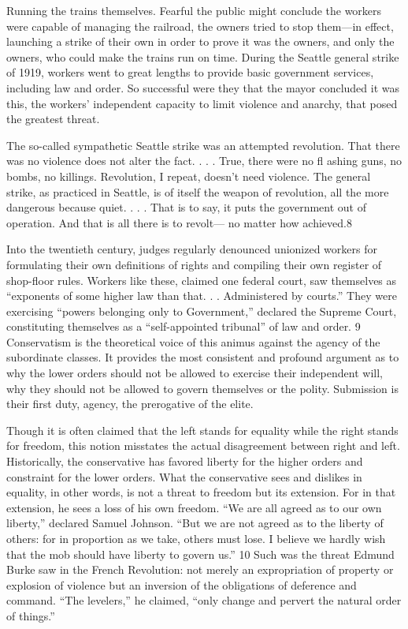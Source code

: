  \par 
Running the trains themselves. Fearful the public might conclude the workers were capable of managing the railroad, the owners tried to stop them—in effect, launching a strike of their own in order to prove it was the owners, and only the owners, who could make the trains run on time. During the Seattle general strike of 1919, workers went to great lengths to provide basic government services, including law and order. So successful were they that the mayor concluded it was this, the workers’ independent capacity to limit violence and anarchy, that posed the greatest threat.
 \par 
The so-called sympathetic Seattle strike was an attempted revolution. That there was no violence does not alter the fact. . . . True, there were no fl ashing guns, no bombs, no killings. Revolution, I repeat, doesn’t need violence. The general strike, as practiced in Seattle, is of itself the weapon of revolution, all the more dangerous because quiet. . . . That is to say, it puts the government out of operation. And that is all there is to revolt— no matter how achieved.{\color{blue}8}
 \par 
Into the twentieth century, judges regularly denounced unionized workers for formulating their own definitions of rights and compiling their own register of shop-floor rules. Workers like these, claimed one federal court, saw themselves as “exponents of some higher law than that. . . Administered by courts.” They were exercising “powers belonging only to Government,” declared the Supreme Court, constituting themselves as a “self-appointed tribunal” of law and order. {\color{blue}9} Conservatism is the theoretical voice of this animus against the agency of the subordinate classes. It provides the most consistent and profound argument as to why the lower orders should not be allowed to exercise their independent will, why they should not be allowed to govern themselves or the polity. Submission is their first duty, agency, the prerogative of the elite.
 \par 
Though it is often claimed that the left stands for equality while the right stands for freedom, this notion misstates the actual disagreement between right and left. Historically, the conservative has favored liberty for the higher orders and constraint for the lower orders. What the conservative sees and dislikes in equality, in other words, is not a threat to freedom but its extension. For in that extension, he sees a loss of his own freedom. “We are all agreed as to our own liberty,” declared Samuel Johnson. “But we are not agreed as to the liberty of others: for in proportion as we take, others must lose. I believe we hardly wish that the mob should have liberty to govern us.” {\color{blue}10} Such was the threat Edmund Burke saw in the French Revolution: not merely an expropriation of property or explosion of violence but an inversion of the obligations of deference and command. “The levelers,” he claimed, “only change and pervert the natural order of things.”
